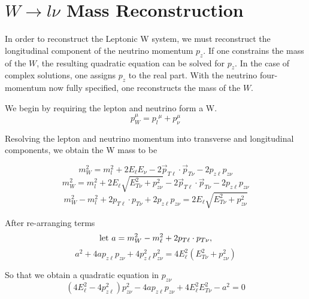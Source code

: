 \section{ $W \rightarrow l\nu$ Mass Reconstruction} 
\label{App:Pzneutrino}

In order to reconstruct the Leptonic W system, we must reconstruct the longitudinal component of the
neutrino momentum $p_z$. If one constrains the mass of the $W$,  the 
resulting quadratic equation can be solved for $p_z$. In the case of complex 
solutions, one assigns $p_z$ to the real part. With the neutrino 
four-momentum now fully specified, one reconstructs the mass of the $W$.


We begin by requiring the lepton and neutrino form a W.
$$ {p_{W}^{\mu}} = p_l{^\mu} + p_{\nu}^{\mu} $$

Resolving the lepton and neutrino momentum into transverse and longitudinal components, we obtain 
the W mass to be

$$ m_W^2 = m_l^2 + 2E_{\ell} E_{\nu} -2 \vec{p}_{T\ell} \cdot \vec{p}_{T\nu} -2{p}_{z\ell}{p}_{z\nu} $$
$$ m_W^2 = m_l^2 + 2E_{\ell} \sqrt{E_{T\nu}^2 + p_{z\nu}^2} -2\vec{p}_{T\ell} \cdot \vec{p}_{T\nu} -2{p}_{z\ell}{p}_{z\nu} $$
$$ m_W^2 - m_l^2 + 2{p}_{T\ell} \cdot {p}_{T\nu} +2{p}_{z\ell}{p}_{z\nu} = 2E_{\ell} \sqrt{E_{T\nu}^2 + p_{z\nu}^2} $$

After re-arranging terms
$$ {\rm let} ~ a = m_W^2 - m_{\ell}^2 + 2{p}_{T\ell} \cdot {p}_{T\nu}, $$
$$ a^2 +4a{p}_{z\ell}{p}_{z\nu} +4{p}_{z\ell}^2{p}_{z\nu}^2  = 4E_{\ell}^2(E_{T\nu}^2 + p_{z\nu}^2)$$

So that we obtain a quadratic equation in $p_{z\nu}$
$$ (4E_{\ell}^2 - 4{p}_{z\ell}^2) {p}_{z\nu}^2 - 4a{p}_{z\ell}{p}_{z\nu} +4E_{\ell}^2E_{T\nu}^2-a^2 =0$$



